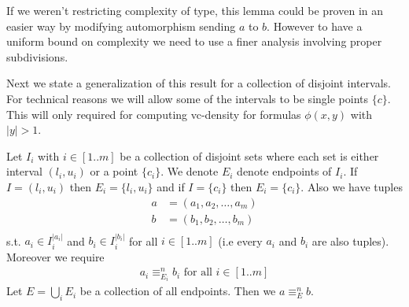 \documentclass{amsart}
\begin{document}
\begin{Note}
	If we weren't restricting complexity of type, this lemma could be proven in an easier way by modifying automorphism sending $a$ to $b$. However to have a uniform bound on complexity we need to use a finer analysis involving proper subdivisions.
\end{Note}

Next we state a generalization of this result for a collection of disjoint intervals. For technical reasons we will allow some of the intervals to be single points $\{c\}$. This will only required for computing vc-density for formulas $\phi(x, y)$ with $|y| > 1$.
\begin{Corollary} \label{cor_disj_int}
	Let $I_i$ with $i \in [1..m]$ be a collection of disjoint sets where each set is either interval $(l_i, u_i)$ or a point $\{c_i\}$. We denote $E_i$ denote endpoints of $I_i$. If $I = (l_i, u_i)$ then $E_i = \{l_i, u_i\}$ and if $I = \{c_i\}$ then $E_i = \{c_i\}$. Also we have tuples
	\begin{align*}
		a &= (a_1, a_2, \ldots, a_m) \\
		b &= (b_1, b_2, \ldots, b_m) \\
	\end{align*}
	 s.t. $a_i \in I_i^{|a_i|}$ and $b_i \in I_i^{|b_i|}$ for all $i \in [1..m]$ (i.e every $a_i$ and $b_i$ are also tuples). Moreover we require
	\begin{align*}
		a_i \equiv^n_{E_i} b_i \text{ for all } i \in [1..m]
	\end{align*}
	Let $E = \bigcup_i E_i$ be a collection of all endpoints. Then we $a \equiv^n_E b$.
\end{Corollary}
\end{document}
